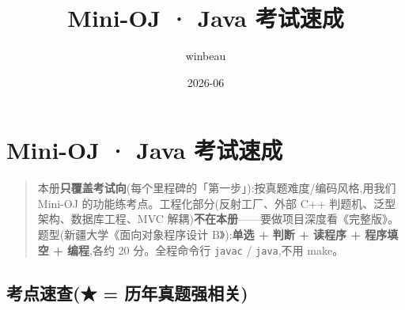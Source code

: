 \documentclass[
  11pt,
]{ctexart}
\title{Mini-OJ · Java 考试速成}
\author{winbeau}
\date{2026-06}
\begin{document}
\maketitle

{
\setcounter{tocdepth}{2}
\tableofcontents
}
\hypertarget{mini-oj-java-ux8003ux8bd5ux901fux6210}{%
\section{Mini-OJ · Java
考试速成}\label{mini-oj-java-ux8003ux8bd5ux901fux6210}}

\begin{quote}
本册\textbf{只覆盖考试向}(每个里程碑的「第一步」):按真题难度/编码风格,用我们
Mini-OJ 的功能练考点。工程化部分(反射工厂、外部 C++
判题机、泛型架构、数据库工程、MVC
解耦)\textbf{不在本册}------要做项目深度看《完整版》。
题型(新疆大学《面向对象程序设计 B》):\textbf{单选 + 判断 + 读程序 +
程序填空 + 编程},各约 20 分。全程命令行 \texttt{javac} /
\texttt{java},不用 make。
\end{quote}

\hypertarget{ux8003ux70b9ux901fux67e5-ux5386ux5e74ux771fux9898ux5f3aux76f8ux5173}{%
\subsection{考点速查(★ =
历年真题强相关)}\label{ux8003ux70b9ux901fux67e5-ux5386ux5e74ux771fux9898ux5f3aux76f8ux5173}}
\end{document}
